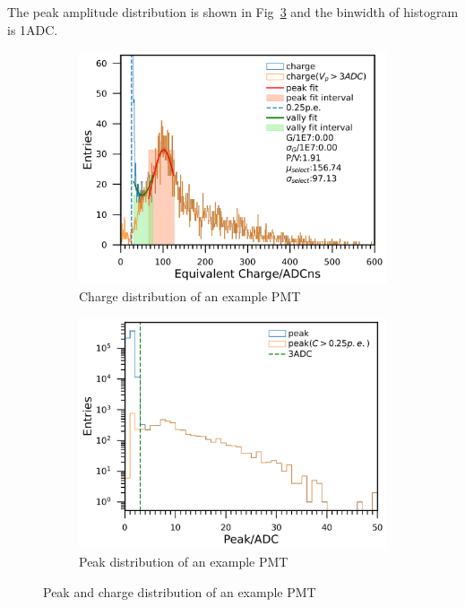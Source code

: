 The peak amplitude distribution is shown in Fig~\ref{fig:peak} and the binwidth of histogram is 1ADC.
\begin{figure}[!htbp]
    \centering
    \begin{subfigure}[t]{0.45\textwidth}
        \includegraphics[width=\textwidth]{figures/method/charge697.pdf}
        \caption{Charge distribution of an example PMT}%
        \label{fig:charge}
    \end{subfigure}
    \begin{subfigure}[t]{0.45\textwidth}
        \includegraphics[width=\textwidth]{figures/method/peak697.pdf}
        \caption{Peak distribution of an example PMT}%
        \label{fig:peak}
    \end{subfigure}
    \caption{Peak and charge distribution of an example PMT}
\end{figure}
